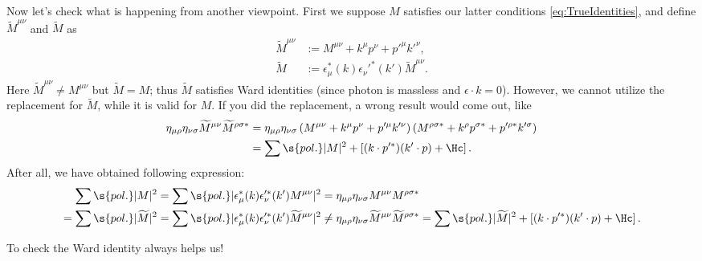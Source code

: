 Now let's check what is happening from another viewpoint. First we suppose
$M$ satisfies our latter conditions \eqref{eq:TrueIdentities}, and define
$\tilde M^{\mu\nu}$ and $\tilde M$ as
\begin{align}
 \tilde M^{\mu\nu}& := M^{\mu\nu} + k^\mu p^\nu + p'^\mu k'^\nu,\\
 \tilde M         & := \epsilon_\mu^*(k)\epsilon_\nu'^*(k')\tilde M^{\mu\nu}.
\end{align}
Here $\tilde M^{\mu\nu}\neq M^{\mu\nu}$ but $\tilde M=M$; thus $\tilde M$ satisfies Ward identities
(since photon is massless and $\epsilon\cdot k=0$).
However, we cannot utilize the replacement for $\tilde M$, while it is valid for $M$.
If you did the replacement, a wrong result would come out, like
\begin{align}
 \Hmrd\Hnsd \tilde M^{\mu\nu}\tilde M^{\rho\sigma*}
 &=  \Hmrd\Hnsd
\left(M^{\mu\nu} + k^\mu p^\nu + p'^\mu k'^\nu \right)
\left(M^{\rho\sigma*} + k^{\rho} p^{\sigma*} + p'^{\rho*}k'^{\sigma} \right)\\
 &= \sum\s{pol.}|M|^2 + \left[(k\cdot p'^*)(k'\cdot p) + \Hc\right].
\end{align}
After all, we have obtained following expression:
\begin{align}
 \sum\s{pol.}|M|^2
&= \sum\s{pol.}|\epsilon_\mu^*(k)\epsilon_\nu'^*(k')M^{\mu\nu}|^2
 = \Hmrd\Hnsd M^{\mu\nu}M^{\rho\sigma*}
\notag\\
 = \sum\s{pol.}|\tilde M|^2
& = \sum\s{pol.}|\epsilon_\mu^*(k)\epsilon_\nu'^*(k')\tilde M^{\mu\nu}|^2
\ne \Hmrd\Hnsd \tilde M^{\mu\nu}\tilde M^{\rho\sigma*}
 = \sum\s{pol.}|\tilde M|^2 + \left[(k\cdot p'^*)(k'\cdot p) + \Hc\right].
\end{align}

To check the Ward identity always helps us!

